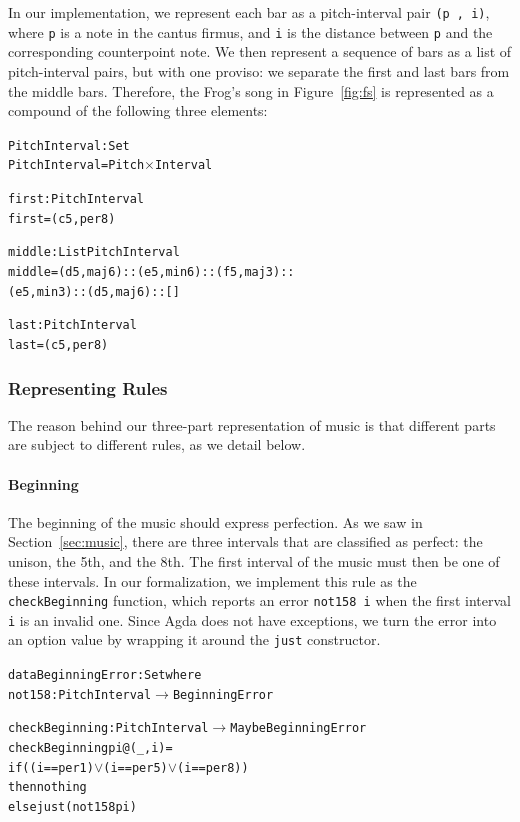 In our implementation, we represent each bar as a pitch-interval
pair \texttt{(p ,  i)}, where \texttt{p} is a note in the cantus firmus,
and \texttt{i} is the distance between \texttt{p} and the corresponding
counterpoint note.
We then represent a sequence of bars as a list of pitch-interval pairs,
but with one proviso: we separate the first and last bars from the
middle bars.
Therefore, the Frog's song in Figure~\ref{fig:fs} is represented as a
compound of the following three elements:

\begin{alltt}
PitchInterval : Set
PitchInterval = Pitch \(\times\) Interval

first : PitchInterval
first = (c 5 , per8)

middle : List PitchInterval
middle = (d 5 , maj6) :: (e 5 , min6) :: (f 5 , maj3) ::
         (e 5 , min3) :: (d 5 , maj6) :: []

last : PitchInterval
last = (c 5 , per8)
\end{alltt}

\subsubsection{Representing Rules}

The reason behind our three-part representation of music is that
different parts are subject to different rules, as we detail below.

\paragraph{Beginning}

The beginning of the music should express perfection.
As we saw in Section~\ref{sec:music}, there are three intervals that
are classified as perfect: the unison, the 5th, and the 8th.
The first interval of the music must then be one of these intervals.
In our formalization, we implement this rule as the
\texttt{checkBeginning} function, which reports an error
\texttt{not158 i} when the first interval \texttt{i} is an invalid one.
Since Agda does not have exceptions, we turn the error into an option
value by wrapping it around the \texttt{just} constructor.

\begin{alltt}
data BeginningError : Set where
  not158   : PitchInterval \(\rightarrow\) BeginningError
  
checkBeginning : PitchInterval \(\rightarrow\) Maybe BeginningError
checkBeginning pi@(_ , i) =
  if ((i == per1) \(\vee\) (i == per5) \(\vee\) (i == per8))
  then nothing
  else just (not158 pi)
\end{alltt}

